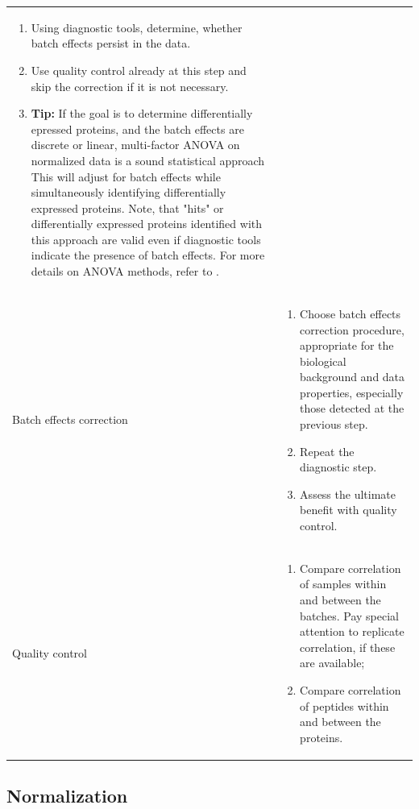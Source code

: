 \documentclass[num-refs]{wiley-article}
\begin{document}
\begin{table}[hbt]
\begin{tcolorbox}
\begin{tabular}{>{\raggedright}p{2cm}m{10.5cm}}
\begin{enumerate}
				\item Using diagnostic tools, determine, whether batch effects persist in the data. 
				\item Use quality control already at this step and skip the correction if it is not necessary.
				\item \textbf{Tip:} If the goal is to determine differentially epressed proteins, and the batch effects are discrete or linear, multi-factor ANOVA on normalized data is a sound statistical approach This will adjust for batch effects while simultaneously identifying differentially expressed proteins. Note, that "hits" or differentially expressed proteins identified with this approach are valid even if diagnostic tools indicate the presence of batch effects. For more details on ANOVA methods, refer to \cite{rice2006mathematical}.
				
			\end{enumerate} \\ 
			Batch effects correction	& 	\begin{enumerate}
				\item	Choose batch effects correction procedure, appropriate for the biological background and data properties, especially those detected at the previous step.
			\item	Repeat the diagnostic step.
			\item	Assess the ultimate benefit with quality control.
\end{enumerate} \\ 

			Quality control 	& 	\begin{enumerate}
				
				\item	Compare correlation of samples within and between the batches. Pay special attention to replicate correlation, if these are available;
				\item	Compare correlation of peptides within and between the proteins.	
			\end{enumerate} \\ 
		\end{tabular}
		
	\end{tcolorbox}
\end{table}
\clearpage

\subsection{Normalization}
\end{document}
